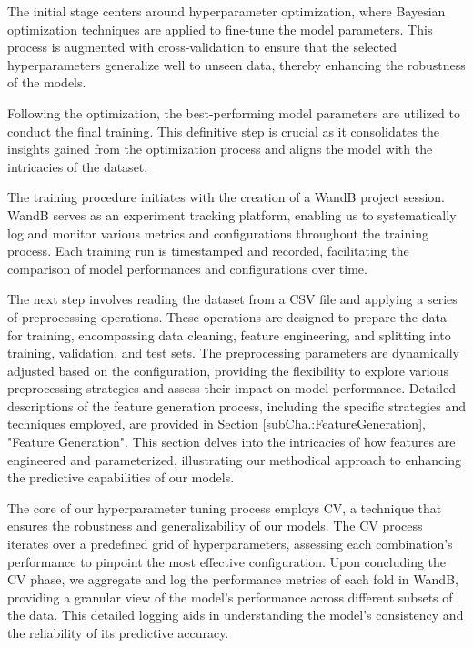 \documentclass{article} %
\begin{document}
The initial stage centers around hyperparameter optimization, where Bayesian optimization techniques are applied to fine-tune the model parameters. This process is augmented with cross-validation to ensure that the selected hyperparameters generalize well to unseen data, thereby enhancing the robustness of the models. 

Following the optimization, the best-performing model parameters are utilized to conduct the final training. This definitive step is crucial as it consolidates the insights gained from the optimization process and aligns the model with the intricacies of the dataset. 

The training procedure initiates with the creation of a \gls*{WandB} project session. \gls*{WandB} serves as an experiment tracking platform, enabling us to systematically log and monitor various metrics and configurations throughout the training process. Each training run is timestamped and recorded, facilitating the comparison of model performances and configurations over time. 

The next step involves reading the dataset from a CSV file and applying a series of preprocessing operations. These operations are designed to prepare the data for training, encompassing data cleaning, feature engineering, and splitting into training, validation, and test sets. The preprocessing parameters are dynamically adjusted based on the configuration, providing the flexibility to explore various preprocessing strategies and assess their impact on model performance. Detailed descriptions of the feature generation process, including the specific strategies and techniques employed, are provided in Section \ref{subCha.:FeatureGeneration}, "Feature Generation". This section delves into the intricacies of how features are engineered and parameterized, illustrating our methodical approach to enhancing the predictive capabilities of our models. 

The core of our hyperparameter tuning process employs \gls*{CV}, a technique that ensures the robustness and generalizability of our models. The \gls*{CV} process iterates over a predefined grid of hyperparameters, assessing each combination's performance to pinpoint the most effective configuration. Upon concluding the \gls*{CV} phase, we aggregate and log the performance metrics of each fold in \gls*{WandB}, providing a granular view of the model's performance across different subsets of the data. This detailed logging aids in understanding the model's consistency and the reliability of its predictive accuracy. 
\end{document}
